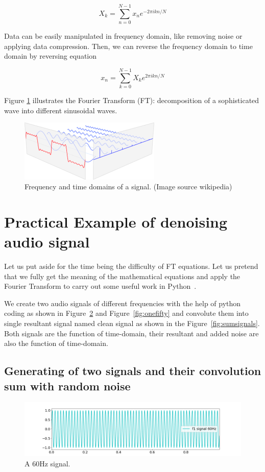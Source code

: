 \documentclass[a4paper, 12pt]{scrartcl}
\begin{document}
\begin{equation}
  X_k = \sum_{n=0}^{N-1} x_n e^{-2 \pi i k n / N}
\end{equation}

Data can be easily manipulated in frequency domain, like removing noise or applying data compression.
Then, we can reverse the frequency domain to time domain by reversing equation

\begin{equation}
  x_n = \sum_{k=0}^{N-1} X_k e^{2 \pi i k n / N}
\end{equation}

Figure \ref{fig:fourier} illustrates the Fourier Transform (FT): decomposition of a sophisticated wave into different sinusoidal waves.

\begin{figure}[H] 
  \centering
  \includegraphics[width=0.6\textwidth]{img/fourier-dimensions.png}
  \caption{Frequency and time domains of a signal. (Image source wikipedia)}
  \label{fig:fourier}
\end{figure}
\section{Practical Example of denoising audio signal}
Let us put aside for the time being the difficulty of FT equations.
Let us pretend that we fully get the meaning of the mathematical equations and apply the Fourier Transform to carry out some useful work in Python~\cite{CleanUpNoise}.

We create two audio signals of different frequencies with the help of python coding as shown in Figure~\ref{fig:sixty} and Figure~\ref{fig:onefifty} 
and convolute them into single resultant signal named clean signal as shown in the Figure~\ref{fig:sumsignals}. 
Both signals are the function of time-domain, their resultant and added noise are also the function of time-domain.
\subsection{Generating of two signals and their convolution sum with random noise}
\begin{figure}[H] 
  \centering
  \includegraphics[width=\textwidth]{img/signal_60hz.png}
  \caption{A 60Hz signal.}
  \label{fig:sixty}
\end{figure}
\end{document}
